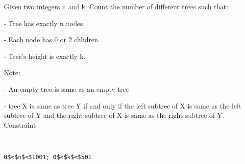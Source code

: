 Given two integers n and k. Count the number of different trees such that:  

   - Tree has exactly n nodes.  

   - Each node has 0 or 2 chlidren.  

   - Tree's height is exactly k.  

   Note:  

   - An empty tree is same as an empty tree  

   - tree X is same as tree Y if and only if the left subtree of X is same as the left subtree of Y and the right subtree of X is same as the right subtree of Y.
   Constraint  
\begin{verbatim}


0$<$n$<$1001; 0$<$k$<$501\end{verbatim}